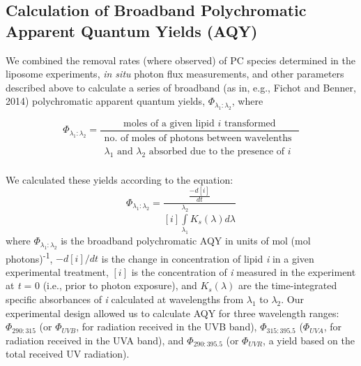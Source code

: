 \subsection{Calculation of Broadband Polychromatic Apparent Quantum Yields (AQY)}
\label{ssec:Calculation of Broadband Polychromatic Apparent Quantum Yields (AQY)}

We combined the removal rates (where observed) of PC species determined in the liposome experiments, \emph{in situ} photon flux measurements, and other parameters described above to calculate a series of broadband (as in, e.g., Fichot and Benner, 2014) polychromatic apparent quantum yields, ${\Phi _{{\lambda _1}:{\lambda _2}}}$, where
\begin{singlespace}
\begin{equation} \label{eq:c4e5}
{\Phi _{{\lambda _1}:{\lambda _2}}} = \frac{{{\text{moles of a given lipid }}i{\text{ transformed}}}}{\begin{gathered}
  {\text{no. of moles of photons between wavelenths }} \\ 
  {\lambda _1}{\text{ and }}{\lambda _{\text{2}}}{\text{ absorbed due to the presence of }}i \\ 
\end{gathered} }
\end{equation}
\end{singlespace} 
\hfill\break
We calculated these yields according to the equation:
\begin{equation} \label{eq:c4e6}
{\Phi _{{\lambda _1}:{\lambda _2}}} = \frac{{\frac{{ - d[i]}}{{dt}}}}{{[i]\int\limits_{{\lambda _1}}^{{\lambda _2}} {{K_s}(\lambda )d\lambda } }}
\end{equation}
where ${\Phi _{{\lambda _1}:{\lambda _2}}}$ is the broadband polychromatic AQY in units of mol (mol photons)\textsuperscript{-1}, $ - d[i]/dt$ is the change in concentration of lipid \emph{i} in a given experimental treatment, $[i]$ is the concentration of \emph{i} measured in the experiment at \emph{t} = 0 (i.e., prior to photon exposure), and ${K_s}(\lambda )$ are the time-integrated specific absorbances of \emph{i} calculated at wavelengths from ${\lambda _1}$ to ${\lambda _2}$. Our experimental design allowed us to calculate AQY for three wavelength ranges: ${\Phi _{290:315}}$ (or ${\Phi _{UVB}}$, for radiation received in the UVB band), ${\Phi _{315:395.5}}$ (${\Phi _{UVA}}$, for radiation received in the UVA band), and ${\Phi _{290:395.5}}$ (or ${\Phi _{UVR}}$, a yield based on the total received UV radiation).

